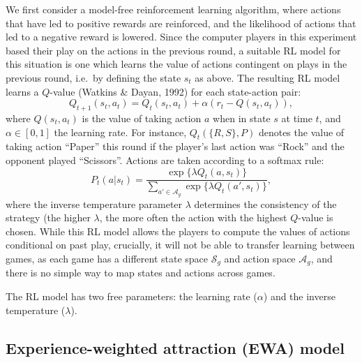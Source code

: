 \documentclass[man,floatsintext]{apa6}
\begin{document}
We first consider a model-free reinforcement learning algorithm, where actions that have led to positive rewards are reinforced, and the likelihood of actions that led to a negative reward is lowered. Since the computer players in this experiment based their play on the actions in the previous round, a suitable RL model for this situation is one which learns the value of actions contingent on plays in the previous round, i.e.~by defining the state \(s_{t}\) as above. The resulting RL model learns a \(Q\)-value (Watkins \& Dayan, 1992) for each state-action pair:
\[Q_{t+1}(s_{t},a_{t}) = Q_{t}(s_{t},a_{t}) + \alpha \left( r_{t}  - Q(s_{t},a_{t}) \right) ,\]
where \(Q(s_{t},a_{t})\) is the value of taking action \(a\) when in state \(s\) at time \(t\), and \(\alpha \in [0,1]\) the learning rate. For instance, \(Q_t(\{R,S\},P)\) denotes the value of taking action \enquote{Paper} this round if the player's last action was \enquote{Rock} and the opponent played \enquote{Scissors}. Actions are taken according to a softmax rule:
\[P_{t}(a|s_t) = \frac{\exp \{ \lambda Q_{t}(a,s_t) \}}{\sum_{a' \in \mathcal{A}_g} \exp \{\lambda  Q_{t}(a',s_t) \}}, \]
where the inverse temperature parameter \(\lambda\) determines the consistency of the strategy (the higher \(\lambda\), the more often the action with the highest \(Q\)-value is chosen. While this RL model allows the players to compute the values of actions conditional on past play, crucially, it will not be able to transfer learning between games, as each game has a different state space \(\mathcal{S}_g\) and action space \(\mathcal{A}_g\), and there is no simple way to map states and actions across games.

The RL model has two free parameters: the learning rate (\(\alpha\)) and the inverse temperature (\(\lambda\)).

\hypertarget{experience-weighted-attraction-ewa-model}{%
\subsection{Experience-weighted attraction (EWA) model}\label{experience-weighted-attraction-ewa-model}}
\end{document}

